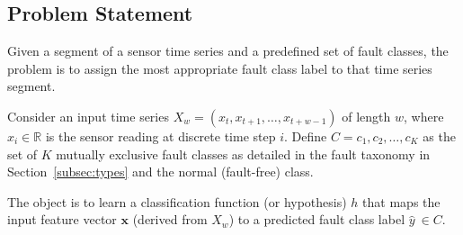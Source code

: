 
\subsection{Problem Statement}
Given a segment of a sensor time series and a predefined set of fault classes, the problem is to assign the most appropriate fault class label to that time series segment.

Consider an input time series \(X_w = (x_t, x_{t+1}, \ldots, x_{t+w-1})\) of length \(w\), where \(x_i \in \mathbb{R}\) is the sensor reading at discrete time step \(i\). Define \(C = {c_1, c_2, \ldots, c_K}\) as the set of \(K\) mutually exclusive fault classes as detailed in the fault taxonomy in Section~\ref{subsec:types} and the normal (fault-free) class.

The object is to learn a classification function (or hypothesis) \(h\) that maps the input feature vector \(\mathbf{x}\) (derived from \(X_w\)) to a predicted fault class label \(\hat{y}\ \in C\).
